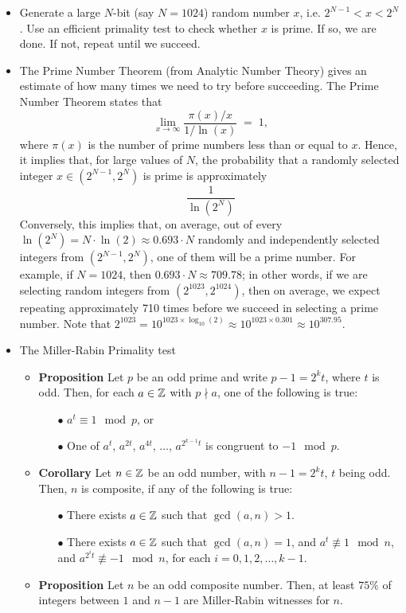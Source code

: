 \begin{itemize}
\item	Generate a large $N$-bit (say $N = 1024$) random number $x$, i.e. $2^{N-1} < x < 2^{N}$.
	Use an efficient primality test to check whether $x$ is prime.
	If so, we are done.  If not, repeat until we succeed.
\item	The Prime Number Theorem (from Analytic Number Theory) gives an estimate of how many times
	we need to try before succeeding.
	The Prime Number Theorem states that
	\begin{equation*}
	\lim_{x \rightarrow \infty} \dfrac{\pi(x)/x}{1/\ln(x)} \; = \; 1,
	\end{equation*}
	where $\pi(x)$ is the number of prime numbers less than or equal to $x$.
	Hence, it implies that, for large values of $N$,
	the probability that a randomly selected integer $x \in (2^{N-1},2^{N})$ is prime is
	approximately
	\begin{equation*}
	\dfrac{1}{\ln(2^{N})}
	\end{equation*}
	Conversely, this implies that, on average, out of every
	$\ln(2^N) = N\cdot\ln(2) \approx 0.693\cdot N$ randomly and independently selected
	integers from $(2^{N-1},2^{N})$, one of them will be a prime number.
	For example, if $N = 1024$, then $0.693\cdot N \approx 709.78$; in other words,
	if we are selecting random integers from $(2^{1023},2^{1024})$, then on average, we
	expect repeating approximately 710 times before we succeed in selecting a prime number.
	Note that $2^{1023} = 10^{1023\times\log_{10}(2)} \approx 10^{1023\times0.301} \approx 10^{307.95}$.
\item	The Miller-Rabin Primality test
	\begin{itemize}
	\item	\textbf{Proposition}\quad
			Let $p$ be an odd prime and write $p-1 = 2^{k}t$, where $t$ is odd.
			Then, for each $a \in \mathbb{Z}$ with $p \nmid a$, one of the following is true:
			\begin{itemize}
			\item[$\bullet$]	$a^{t} \equiv 1 \mod p$,\; or
			\item[$\bullet$]	One of $a^{t}$, $a^{2t}$, $a^{4t}$, $\ldots$, $a^{2^{k-1}t}$ is congruent to $-1\mod p$.
			\end{itemize}
	\item	\textbf{Corollary}\quad
			Let $n \in \mathbb{Z}$ be an odd number, with $n-1 = 2^{k}t$, $t$ being odd.
			Then, $n$ is composite, if any of the following is true:
			\begin{itemize}
			\item[$\bullet$]	There exists $a \in \mathbb{Z}$ such that $\gcd(a,n) > 1$.
			\item[$\bullet$]	There exists $a \in \mathbb{Z}$ such that $\gcd(a,n) = 1$, and $a^{t} \not\equiv 1 \mod n$,
							and $a^{2^{i}t} \not\equiv -1 \mod n$, for each $i = 0, 1, 2, \ldots, k-1$.
			\end{itemize}	
	\item	\textbf{Proposition}\quad
			Let $n$ be an odd composite number.
			Then, at least $75\%$ of integers between $1$ and $n-1$ are Miller-Rabin witnesses for $n$.
	\end{itemize}
\end{itemize}

